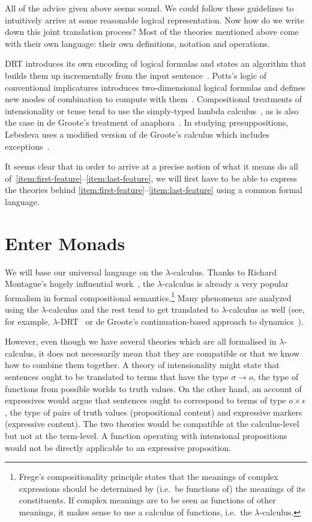 All of the advice given above seems sound. We could follow these guidelines
to intuitively arrive at some reasonable logical representation. Now how do
we write down this joint translation process? Most of the theories
mentioned above come with their own language: their own definitions,
notation and operations.

DRT introduces its own encoding of logical formulas and states an algorithm
that builds them up incrementally from the input
sentence~\cite{kamp1993discourse}. Potts's logic of conventional
implicatures introduces two-dimensional logical formulas and defines new
modes of combination to compute with
them~\cite{potts2005logic}. Compositional treatments of intensionality or
tense tend to use the simply-typed lambda
calculus~\cite{ben2007semantics,de2013note}, as is also the case in de
Groote's treatment of anaphora~\cite{de2006towards}. In studying
presuppositions, Lebedeva uses a modified version of de Groote's calculus
which includes exceptions~\cite{lebedeva2012expression}.

It seems clear that in order to arrive at a precise notion of what it means
do all of~\ref{item:first-feature}--\ref{item:last-feature}, we will first
have to be able to express the theories behind
\ref{item:first-feature}--\ref{item:last-feature} using a common formal
language.

\section*{Enter Monads}

We will base our universal language on the $\lambda$-calculus. Thanks to
Richard Montague's hugely influential work~\cite{montague1973proper}, the
$\lambda$-calculus is already a very popular formalism in formal
compositional semantics.\footnote{Frege's compositionality principle states
  that the meanings of complex expressions should be determined by (i.e.\
  be functions of) the meanings of its constituents. If complex meanings
  are to be seen as functions of other meanings, it makes sense to use a
  calculus of functions, i.e.\ the $\lambda$-calculus.} Many phenomena are
analyzed using the $\lambda$-calculus and the rest tend to get translated
to $\lambda$-calculus as well (see, for example,
$\lambda$-DRT~\cite{kuschert1995type} or de Groote's continuation-based
approach to dynamics~\cite{de2006towards}).

However, even though we have several theories which are all formalised in
$\lambda$-calculus, it does not necessarily mean that they are compatible
or that we know how to combine them together. A theory of intensionality
might state that sentences ought to be translated to terms that have the
type $\sigma \to o$, the type of functions from possible worlds to truth
values. On the other hand, an account of expressives would argue that
sentences ought to correspond to terms of type $o \times \epsilon$, the
type of pairs of truth values (propositional content) and expressive
markers (expressive content). The two theories would be compatible at the
calculus-level but not at the term-level. A function operating with
intensional propositions would not be directly applicable to an expressive
proposition.

